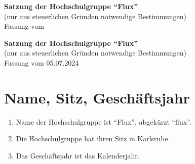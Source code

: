 \documentclass[11pt]{article}
\begin{document}
\begin{center}
	\Large
	\textbf{
		Satzung der Hochschulgruppe ``Flux''}\\
	\normalsize
	(nur aus steuerlichen Gründen notwendige Bestimmungen)\\
	\vspace{10mm}
	Fassung vom 
	\vspace{10mm}
\end{center}
\begin{center}
	\Large
	\textbf{
		Satzung der Hochschulgruppe ``Flux''}\\
	\normalsize
	(nur aus steuerlichen Gründen notwendige Bestimmungen)\\
	\vspace{10mm}
	Fassung vom 05.07.2024
	\vspace{10mm}
\end{center}

\section{Name, Sitz, Geschäftsjahr}
\begin{enumerate}
	\item Name der Hochschulgruppe ist ``Flux'', abgekürzt ``flux''.
	\item Die Hochschulgruppe hat ihren Sitz in Karlsruhe.
	\item Das Geschäftsjahr ist das Kalenderjahr.
\end{enumerate}
\end{document}
